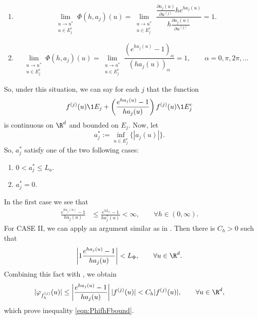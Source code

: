\documentclass[sort&compress, preprint]{elsarticle}
\theoremstyle{definition}
\theoremstyle{plain}%
\theoremstyle{remark}
\begin{document}
\begin{pf}
	\begin{enumerate}[C{A}SE I:]
		\item
			\begin{equation}\label{eqn:ajSingularityCasei}
				\lim_{
					\substack{
						u \to u^*\\ 
						u\in E_j^c
					}
				}
				\Phi(h,a_j)(u) =
				\lim_{
					\substack{
						u \to u^*\\ 
						u\in E_j^c
					}
				}	
				\frac{\frac{\partial a_j(u)}{\partial u^{(j)}} 
					h e^{h a_j(u)} 
				}{
					h\frac{\partial a_j(u)}{\partial u^{(j)}}
				}=1.
			\end{equation}	
		\item
			\begin{equation}\label{eqn:ajSingularityCaseii}
			\lim_{
				\substack{
					u \to u^*\\ 
					u\in E_j^c
				}
			}
			\Phi(h,a_j)(u) 
			=
			\lim_{
				\substack{
					u \to u^*\\ 
					u\in E_j^c
				}
			}	
			\frac{
				\left(
					 e^{h a_j(u)} - 1
				 \right)_{\alpha}
			}{
				\left(
					h a_j(u)
				\right)_{\alpha}
			}	=	1, \qquad \alpha = 0,\pi, 2\pi,\dots
		\end{equation}	
	\end{enumerate}
	So, under this situation, we can say for each $j$ that the function
	\begin{equation*}
		f^{(j)}(u) \1{E_j} +
		\left(
			\frac{e^{ha_j(u)}-1}{ha_j(u)}
		\right)
		f^{(j)}(u) \1{E_j^c}
	\end{equation*}
	is continuous on $\R^d$ and bounded on $E_j$.
	Now, let
		$$
			a^*_j:= \inf_{u\in E_j^c}
			\{
				|a_j(u)|
			\}.
		$$
	So, $a^*_j$ satisfy one of the two following cases:
	\begin{enumerate}[C{A}SE I:]
		\item
			$
				\displaystyle
				0 < a_j^*\leq L_a. 
			$
		\item
			$a_j^*=0$.
	\end{enumerate}
	In the first case we see that
	\begin{align*}
		\frac{e^{h a_j(u)}-1}{ha_j(u)}
		& \leq
			\frac{e^{h L_a}-1}{ha^*_j(u)} <\infty,
		\qquad \forall h\in (0,\infty ).
	\end{align*}
	For CASE II, we can apply an argument similar as in .
	Then there is  $C_h>0$ such that
	\begin{equation}\label{eqn:PhiBound}
		\left|1
			\frac{e^{ha_j(u)}-1}{ha_j(u)}
		\right| < L_{\Phi},
		\qquad \forall u \in \R^d.
	\end{equation}	
%		
	Combining this fact with , we obtain
	$$
		|\varphi_{f_h^{(j)}}(u)|
		\leq
		\left|
			\frac{e^{ha_j(u)}-1}{ha_j(u)}
		\right||f^{(j)}(u)| < C_h |f^{(j)}(u)|,
		\qquad \forall u \in \R^d,
	$$
	which prove inequality \eqref{eqn:PhifhFbound}.
	

\end{pf}
\end{document}
